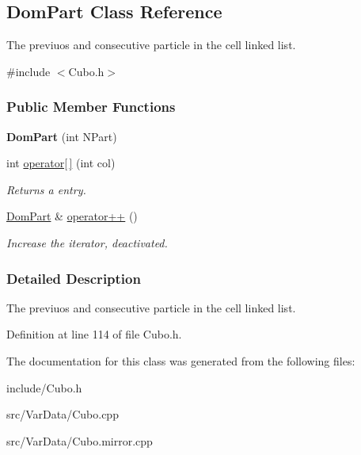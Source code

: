 \hypertarget{classDomPart}{}\subsection{Dom\+Part Class Reference}
\label{classDomPart}


The previuos and consecutive particle in the cell linked list.  




{\ttfamily \#include $<$Cubo.\+h$>$}

\subsubsection*{Public Member Functions}
\begin{DoxyCompactItemize}
\item 
{\bfseries Dom\+Part} (int N\+Part)\hypertarget{classDomPart_ab2a1821c2ce0c7963f55101016fb438d}{}\label{classDomPart_ab2a1821c2ce0c7963f55101016fb438d}

\item 
int \hyperlink{classDomPart_a72c73510fb6bfedfb82d906895bdaf07}{operator\mbox{[}$\,$\mbox{]}} (int col)\hypertarget{classDomPart_a72c73510fb6bfedfb82d906895bdaf07}{}\label{classDomPart_a72c73510fb6bfedfb82d906895bdaf07}

\begin{DoxyCompactList}\small\item\em Returns a entry. \end{DoxyCompactList}\item 
\hyperlink{classDomPart}{Dom\+Part} \& \hyperlink{classDomPart_a580c80d8a662e0f4c16d04778d140dda}{operator++} ()\hypertarget{classDomPart_a580c80d8a662e0f4c16d04778d140dda}{}\label{classDomPart_a580c80d8a662e0f4c16d04778d140dda}

\begin{DoxyCompactList}\small\item\em Increase the iterator, deactivated. \end{DoxyCompactList}\end{DoxyCompactItemize}


\subsubsection{Detailed Description}
The previuos and consecutive particle in the cell linked list. 

Definition at line 114 of file Cubo.\+h.



The documentation for this class was generated from the following files\+:\begin{DoxyCompactItemize}
\item 
include/Cubo.\+h\item 
src/\+Var\+Data/Cubo.\+cpp\item 
src/\+Var\+Data/Cubo.\+mirror.\+cpp\end{DoxyCompactItemize}
